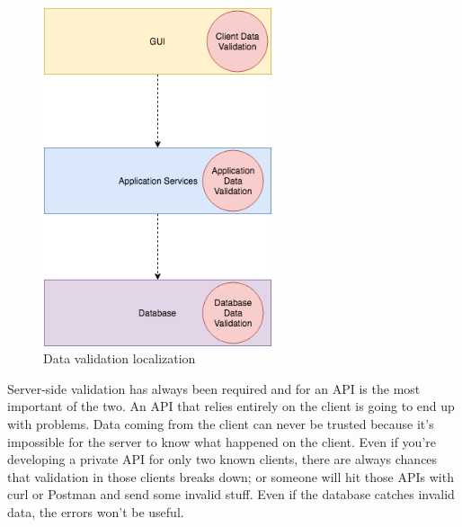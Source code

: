 \begin{figure}[htp]%
    \center%
    \includegraphics[width=0.6\textwidth]{images/ch4/validation.png}%
    \caption[Data validation localization]{Data validation localization}\label{fig: Data validation localization}%
  \end{figure}
\newline

Server-side validation has always been required and for an API is the most important of the two. An API that relies entirely on the client is going to end up with problems. Data coming from the client can never be trusted because it's impossible for the server to know what happened on the client. Even if you're developing a private API for only two known clients, there are always chances that validation in those clients breaks down; or someone will hit those APIs with curl or Postman and send some invalid stuff. Even if the database catches invalid data, the errors won't be useful.\\

